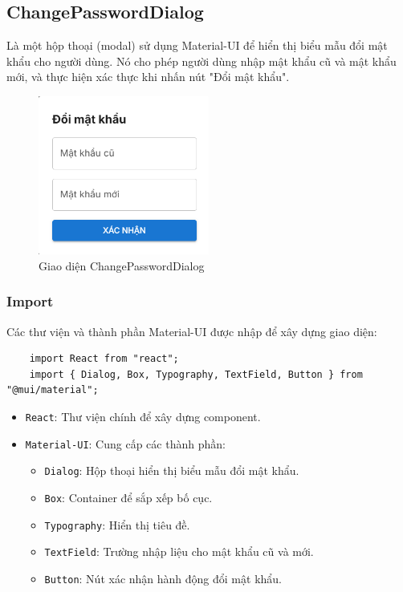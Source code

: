         \subsection{ChangePasswordDialog}
            \hspace*{0.6cm}Là một hộp thoại (modal) sử dụng Material-UI để hiển thị biểu mẫu đổi mật khẩu cho người dùng. Nó cho phép người dùng nhập mật khẩu cũ và mật khẩu mới, và thực hiện xác thực khi nhấn nút "Đổi mật khẩu".
            \begin{figure}[H]
                \centering
                \includegraphics[width=0.5\textwidth]{pictures/ChangePasswordDialog.png}
                \caption{Giao diện ChangePasswordDialog}
                \label{fig:change}
            \end{figure}
            \subsubsection{Import}
                \hspace*{0.6cm}Các thư viện và thành phần Material-UI được nhập để xây dựng giao diện:
                \begin{lstlisting}
    import React from "react";
    import { Dialog, Box, Typography, TextField, Button } from "@mui/material";
                \end{lstlisting}
                \begin{itemize}
                    \item \texttt{React}: Thư viện chính để xây dựng component.
                    \item \texttt{Material-UI}: Cung cấp các thành phần:
                    \begin{itemize}
                        \item \texttt{Dialog}: Hộp thoại hiển thị biểu mẫu đổi mật khẩu.
                        \item \texttt{Box}: Container để sắp xếp bố cục.
                        \item \texttt{Typography}: Hiển thị tiêu đề.
                        \item \texttt{TextField}: Trường nhập liệu cho mật khẩu cũ và mới.
                        \item \texttt{Button}: Nút xác nhận hành động đổi mật khẩu.
                    \end{itemize}
                \end{itemize}

